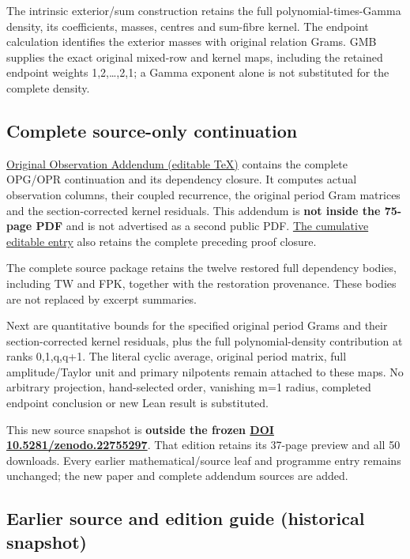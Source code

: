 \documentclass[
]{article}
\begin{document}
The intrinsic exterior/sum construction retains the full
polynomial-times-Gamma density, its coefficients, masses, centres and
sum-fibre kernel. The endpoint calculation identifies the exterior
masses with original relation Grams. GMB supplies the exact original
mixed-row and kernel maps, including the retained endpoint weights
1,2,\ldots,2,1; a Gamma exponent alone is not substituted for the
complete density.

\subsection{Complete source-only
continuation}\label{complete-source-only-continuation}

\href{workbenches/splitzero-tandem/continuations/20260914-original-volumes/next_original_observation/Original_Observation_Addendum.tex}{Original
Observation Addendum (editable TeX)} contains the complete OPG/OPR
continuation and its dependency closure. It computes actual observation
columns, their coupled recurrence, the original period Gram matrices and
the section-corrected kernel residuals. This addendum is \textbf{not
inside the 75-page PDF} and is not advertised as a second public PDF.
\href{workbenches/splitzero-tandem/continuations/20260914-original-volumes/Cumulative_Original_Gamma_Proofs.tex}{The
cumulative editable entry} also retains the complete preceding proof
closure.

The complete source package retains the twelve restored full dependency
bodies, including TW and FPK, together with the restoration provenance.
These bodies are not replaced by excerpt summaries.

Next are quantitative bounds for the specified original period Grams and
their section-corrected kernel residuals, plus the full
polynomial-density contribution at ranks 0,1,q,q+1. The literal cyclic
average, original period matrix, full amplitude/Taylor unit and primary
nilpotents remain attached to these maps. No arbitrary projection,
hand-selected order, vanishing m=1 radius, completed endpoint conclusion
or new Lean result is substituted.

This new source snapshot is \textbf{outside the frozen
\href{https://doi.org/10.5281/zenodo.22755297}{DOI
10.5281/zenodo.22755297}}. That edition retains its 37-page preview and
all 50 downloads. Every earlier mathematical/source leaf and programme
entry remains unchanged; the new paper and complete addendum sources are
added.

\subsection{Earlier source and edition guide (historical
snapshot)}\label{earlier-source-and-edition-guide-historical-snapshot-18}
\end{document}
